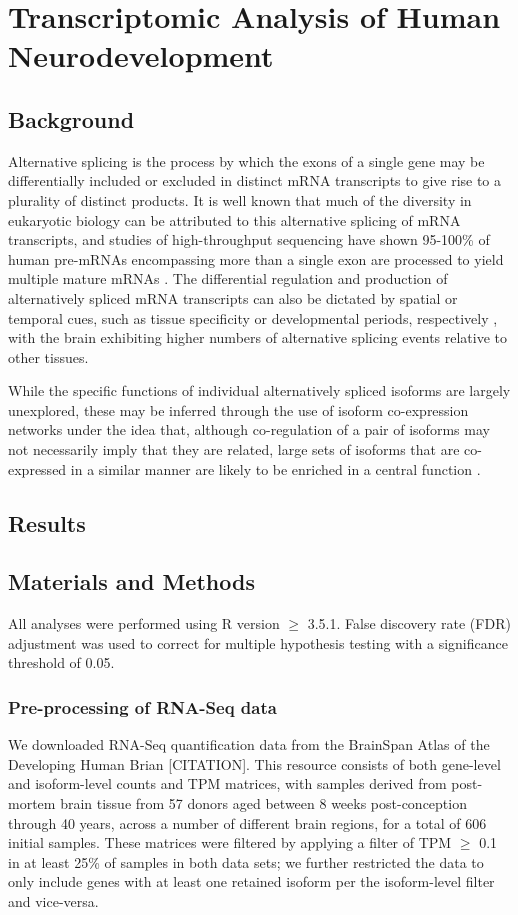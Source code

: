 \chapter{Transcriptomic Analysis of Human Neurodevelopment}
\section{Background}
Alternative splicing is the process by which the exons of a single gene may be differentially included or excluded in distinct mRNA transcripts to give rise to a plurality of distinct products. It is well known that much of the diversity in eukaryotic biology can be attributed to this alternative splicing of mRNA transcripts, and studies of high-throughput sequencing have shown 95-100\% of human pre-mRNAs encompassing more than a single exon are processed to yield multiple mature mRNAs \cite{Pan2008, Wang2008}. The differential regulation and production of alternatively spliced mRNA transcripts can also be dictated by spatial or temporal cues, such as tissue specificity or developmental periods, respectively \cite{Nilsen2010, Porter2018}, with the brain exhibiting higher numbers of alternative splicing events relative to other tissues\cite{Pan2008, Yeo2004, Xu2002}.\par
While the specific functions of individual alternatively spliced isoforms are largely unexplored, these may be inferred through the use of isoform co-expression networks under the idea that, although co-regulation of a pair of isoforms may not necessarily imply that they are related, large sets of isoforms that are co-expressed in a similar manner are likely to be enriched in a central function \cite{Carter2004, Stuart2003}. 
\section{Results}
\section{Materials and Methods}
All analyses were performed using R version $\geq$ 3.5.1. False discovery rate (FDR) adjustment was used to correct for multiple hypothesis testing with a significance threshold of 0.05.
\subsection{Pre-processing of RNA-Seq data}
We downloaded RNA-Seq quantification data from the BrainSpan Atlas of the Developing Human Brian [CITATION]. This resource consists of both gene-level and isoform-level counts and TPM matrices, with samples derived from post-mortem brain tissue from 57 donors aged between 8 weeks post-conception through 40 years, across a number of different brain regions, for a total of 606 initial samples. These matrices were filtered by applying a filter of TPM $\geq$ 0.1 in at least 25\% of samples in both data sets; we further restricted the data to only include genes with at least one retained isoform per the isoform-level filter and vice-versa.
